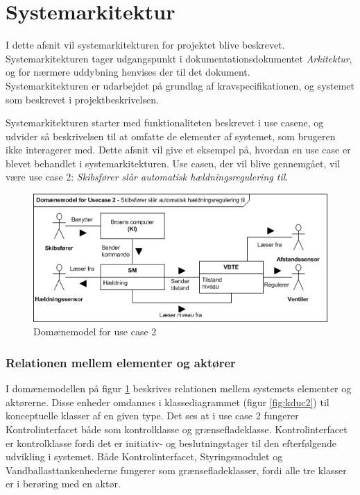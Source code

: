 \section{Systemarkitektur}
\label{ch:systemarkitektur}
I dette afsnit vil systemarkitekturen for projektet blive beskrevet. Systemarkitekturen tager udgangspunkt i dokumentationsdokumentet \textit{Arkitektur}, og for nærmere uddybning henvises der til det dokument.\\
Systemarkitekturen er udarbejdet på grundlag af kravspecifikationen, og systemet som beskrevet i projektbeskrivelsen.

Systemarkitekturen starter med funktionaliteten beskrevet i use casene, og udvider så beskrivelsen til at omfatte de elementer af systemet, som brugeren ikke interagerer med. Dette afsnit vil give et eksempel på, hvordan en use case er blevet behandlet i systemarkitekturen. Use casen, der vil blive gennemgået, vil være use case 2: \textit{Skibsfører slår automatisk hældningsregulering til}.

\begin{figure}[H]
\centering
\includegraphics[scale=0.8]{billeder/Systemarkitektur/DM_UC2}
\caption{Domænemodel for use case 2}
\label{fig:dmuc2}
\end{figure}

\subsubsection{Relationen mellem elementer og aktører}
I domænemodellen på figur \ref{fig:dmuc2} beskrives relationen mellem systemets elementer og aktørerne. Disse enheder omdannes i klassediagrammet (figur \ref{fig:kduc2}) til konceptuelle klasser af en given type. Det ses at i use case 2 fungerer Kontrolinterfacet både som kontrolklasse og grænsefladeklasse. Kontrolinterfacet er kontrolklasse fordi det er initiativ- og beslutningstager til den efterfølgende udvikling i systemet. Både Kontrolinterfacet, Styringsmodulet og Vandballasttankenhederne fungerer som grænsefladeklasser, fordi alle tre klasser er i berøring med en aktør.\\

